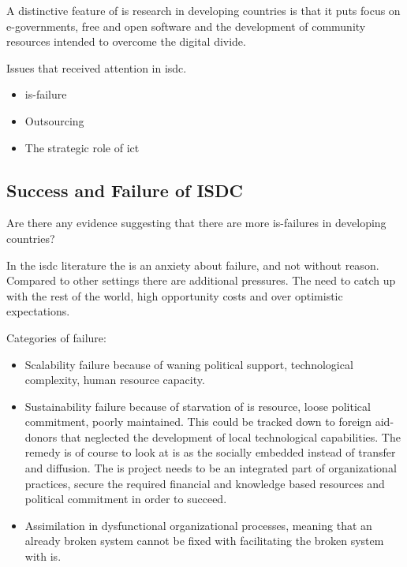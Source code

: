 A distinctive feature of \gls{is} research in developing countries is that it puts focus on e-governments, free and open software and the development of community resources intended to overcome the digital divide.

Issues that received attention in \gls{isdc}.
\begin{itemize}
\item \gls{is}-failure
\item Outsourcing
\item The strategic role of \gls{ict}
\end{itemize}

\cite{ca:isdc}

\subsection{Success and Failure of ISDC}
\label{successandfailure}

Are there any evidence suggesting that there are more \gls{is}-failures in developing countries?




In the \gls{isdc} literature the is an anxiety about failure, and not without reason.
Compared to other settings there are additional pressures.
The need to catch up with the rest of the world, high opportunity costs and over optimistic expectations.




Categories of failure:
\begin{itemize}
\item Scalability failure because of waning political support, technological complexity, human resource capacity.
\item Sustainability failure because of starvation of \gls{is} resource, loose political commitment, poorly maintained. This could be tracked down to foreign aid-donors that neglected the development of local technological capabilities. The remedy is of course to look at \gls{is} as the socially embedded instead of transfer and diffusion. The \gls{is} project needs to be an integrated part of organizational practices, secure the required financial and knowledge based resources and political commitment in order to succeed.
\item Assimilation in dysfunctional organizational processes, meaning that an already broken system cannot be fixed with facilitating the broken system with \gls{is}.
\end{itemize}





